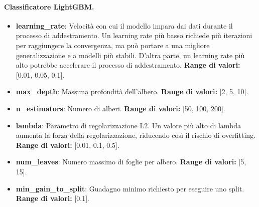 \noindent\paragraph{Classificatore LightGBM.}
\begin{itemize}[leftmargin=*]
    \item \textbf{learning\_rate}: Velocità con cui il modello impara dai dati durante il processo di addestramento. Un learning rate più basso richiede più iterazioni per raggiungere la convergenza, ma può portare a una migliore generalizzazione e a modelli più stabili. D'altra parte, un learning rate più alto potrebbe accelerare il processo di addestramento. \textbf{Range di valori:} [0.01, 0.05, 0.1].
    \item \textbf{max\_depth}: Massima profondità dell'albero. \textbf{Range di valori:} [2, 5, 10].
    \item \textbf{n\_estimators}: Numero di alberi. \textbf{Range di valori:} [50, 100, 200].
    \item \textbf{lambda}: Parametro di regolarizzazione L2. Un valore più alto di lambda aumenta la forza della regolarizzazione, riducendo così il rischio di overfitting. \textbf{Range di valori:} [0.01, 0.1, 0.5].
    \item \textbf{num\_leaves}: Numero massimo di foglie per albero. \textbf{Range di valori:} [5, 15].
    \item \textbf{min\_gain\_to\_split}: Guadagno minimo richiesto per eseguire uno split. \textbf{Range di valori:} [0.1].
\end{itemize}

